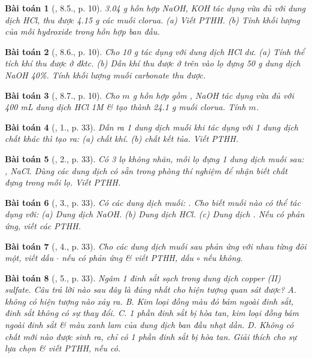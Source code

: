 \documentclass{article}
\newtheorem{baitoan}{Bài toán}
\begin{document}
\begin{baitoan}[\cite{SGK_Hoa_Hoc_9}, 8.5., p. 10]
	{\rm3.04 g} hỗn hợp {\rm NaOH, KOH} tác dụng vừa đủ với dung dịch {\rm HCl}, thu được {\rm4.15 g} các muối clorua. (a) Viết {\rm PTHH}. (b) Tính khối lượng của mỗi hydroxide trong hỗn hợp ban đầu.
\end{baitoan}

\begin{baitoan}[\cite{SGK_Hoa_Hoc_9}, 8.6., p. 10]
	Cho {\rm10 g } tác dụng với dung dịch {\rm HCl} dư. (a) Tính thể tích khí {\rm{}} thu được ở đktc. (b) Dẫn khí {\rm{}} thu được ở trên vào lọ đựng {\rm50 g} dung dịch {\rm NaOH 40\%}. Tính khối lượng muối carbonate thu được.
\end{baitoan}

\begin{baitoan}[\cite{SGK_Hoa_Hoc_9}, 8.7., p. 10]
	Cho $m$ {\rm g} hỗn hợp gồm {\rm{}, NaOH} tác dụng vừa đủ với {\rm400 mL} dung dịch {\rm HCl 1M} \& tạo thành {\rm24.1 g} muối clorua. Tính $m$.
\end{baitoan}

\begin{baitoan}[\cite{SGK_Hoa_Hoc_9}, 1., p. 33]
	Dẫn ra 1 dung dịch muối khi tác dụng với 1 dung dịch chất khác thì tạo ra: (a) chất khí. (b) chất kết tủa. Viết {\rm PTHH}.
\end{baitoan}

\begin{baitoan}[\cite{SGK_Hoa_Hoc_9}, 2., p. 33]
	Có 3 lọ không nhãn, mỗi lọ đựng 1 dung dịch muối sau: {\rm{}, NaCl}. Dùng các dung dịch có sẵn trong phòng thí nghiệm để nhận biết chất đựng trong mỗi lọ. Viết {\rm PTHH}.
\end{baitoan}

\begin{baitoan}[\cite{SGK_Hoa_Hoc_9}, 3., p. 33]
	Có các dung dịch muối: {\rm{}}. Cho biết muối nào có thể tác dụng với: (a) Dung dịch {\rm NaOH}. (b) Dung dịch {\rm HCl}. (c) Dung dịch {\rm{}}. Nếu có phản ứng, viết các PTHH.
\end{baitoan}

\begin{baitoan}[\cite{SGK_Hoa_Hoc_9}, 4., p. 33]
	Cho các dung dịch muối sau phản ứng với nhau từng đôi một, viết dấu $\cdot$ nếu có phản ứng \& viết PTHH, dấu $\circ$ nếu không.
\end{baitoan}

\begin{baitoan}[\cite{SGK_Hoa_Hoc_9}, 5., p. 33]
	Ngâm 1 đinh sắt sạch trong dung dịch copper {\rm(II)} sulfate. Câu trả lời nào sau đây là đúng nhất cho hiện tượng quan sát được? {\sf A.} không có hiện tượng nào xảy ra. {\sf B.} Kim loại đồng màu đỏ bám ngoài đinh sắt, đinh sắt không có sự thay đổi. {\sf C.} 1 phần đinh sắt bị hòa tan, kim loại đồng bám ngoài đinh sắt \& màu xanh lam của dung dịch ban đầu nhạt dần. {\sf D.} Không có chất mới nào được sinh ra, chỉ có 1 phần đinh sắt bị hòa tan. Giải thích cho sự lựa chọn \& viết PTHH, nếu có.
\end{baitoan}
\end{document}

